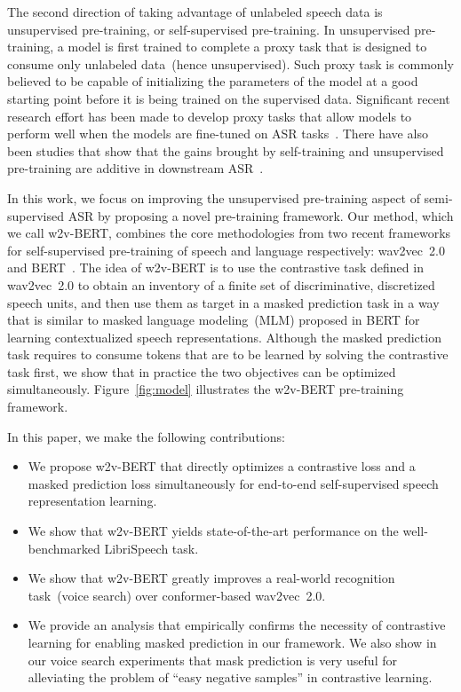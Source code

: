 \documentclass{article}
\begin{document}
The second direction of taking advantage of unlabeled speech data is unsupervised pre-training, or self-supervised pre-training.
In unsupervised pre-training, a model is first trained to complete a proxy task that is designed to consume only unlabeled data~(hence unsupervised).
Such proxy task is commonly believed to be capable of initializing the parameters of the model at a good starting point before it is being trained on the supervised data.
Significant recent research effort has been made to develop proxy tasks that allow models to perform well when the models are fine-tuned on ASR tasks~\cite{oord2018representation,chung2019unsupervised,schneider2019wav2vec,ling2020deep,chung2020generative,liu2020mockingjay,chung2020improved,liu2021tera,wang2020unsupervised,ling2020decoar,bai2021representation}.
There have also been studies that show that the gains brought by self-training and unsupervised pre-training are additive in downstream ASR~\cite{zhang2020pushing,xu2021self}.

In this work, we focus on improving the unsupervised pre-training aspect of semi-supervised ASR by proposing a novel pre-training framework.
Our method, which we call w2v-BERT, combines the core methodologies from two recent frameworks for self-supervised pre-training of speech and language respectively: wav2vec~2.0~\cite{baevski2020wav2vec} and BERT~\cite{devlin2019bert}.
The idea of w2v-BERT is to use the contrastive task defined in wav2vec~2.0 to obtain an inventory of a finite set of discriminative, discretized speech units, and then use them as target in a masked prediction task in a way that is similar to masked language modeling~(MLM) proposed in BERT for learning contextualized speech representations.
Although the masked prediction task requires to consume tokens that are to be learned by solving the contrastive task first, we show that in practice the two objectives can be optimized simultaneously.
Figure~\ref{fig:model} illustrates the w2v-BERT pre-training framework.

In this paper, we make the following contributions:
\begin{itemize}
  \item We propose w2v-BERT that directly optimizes a contrastive loss and a masked prediction loss simultaneously for end-to-end self-supervised speech representation learning.
  \item We show that w2v-BERT yields state-of-the-art performance on the well-benchmarked LibriSpeech task.
  \item We show that w2v-BERT greatly improves a real-world recognition task~(voice search) over conformer-based wav2vec~2.0.
  \item We provide an analysis that empirically confirms the necessity of contrastive learning for enabling masked prediction in our framework. We also show in our voice search experiments that mask prediction is very useful for alleviating the problem of ``easy negative samples'' in contrastive learning.
\end{itemize}
\end{document}
